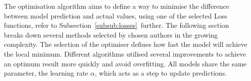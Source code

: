 The optimisation algorithm aims to define a way to minimise the difference between model prediction and actual values, using one of the selected Loss functions, refer to \mbox{Subsection~\ref{subsub:losses} further}.
The following section breaks down several methods selected by chosen authors in the growing complexity.
The selection of the optimiser defines how fast the model will achieve the local minimum.
Different algorithms utilised several improvements to achieve an optimum result more quickly and avoid overfitting.
All models share the same parameter, the learning rate $\alpha$, which acts as a step to update predictions.

